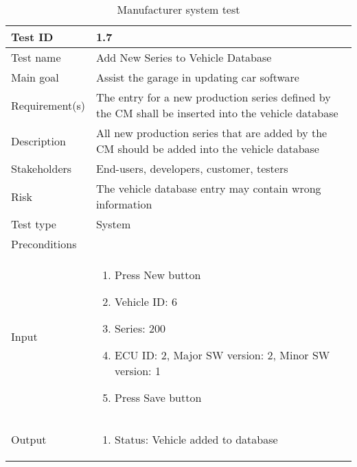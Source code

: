 \begin{table}[H]
\centering
\caption{Manufacturer system test}
\begin{tabularx}{1.0\textwidth}{
    |p{}     %
    |p{}|    %
}
\hline

Test ID
& 1.7
\\
\hline

Test name
& Add New Series to Vehicle Database
\\
\hline

Main goal
& Assist the garage in updating car software
\\
\hline

Requirement(s)
& The  entry  for  a  new  production  series  defined  by  the  CM shall be inserted into the vehicle database
\\
\hline

Description
& All new production series that are added by the CM should be added into the vehicle database
\\
\hline

Stakeholders
& End-users, developers, customer, testers
\\
\hline

Risk
& The vehicle database entry may contain wrong information
\\
\hline

Test type
& System
\\
\hline

Preconditions
& 
\\
\hline

Input
& \begin{enumerate}
    \item Press New button
    \item Vehicle ID: 6
    \item Series: 200
    \item ECU ID: 2, Major SW version: 2, Minor SW version: 1
    \item Press Save button
\end{enumerate}
\\
\hline

Output
& \begin{enumerate}
    \item Status: Vehicle added to database
\end{enumerate}
\\
\hline


\end{tabularx}
\end{table}
